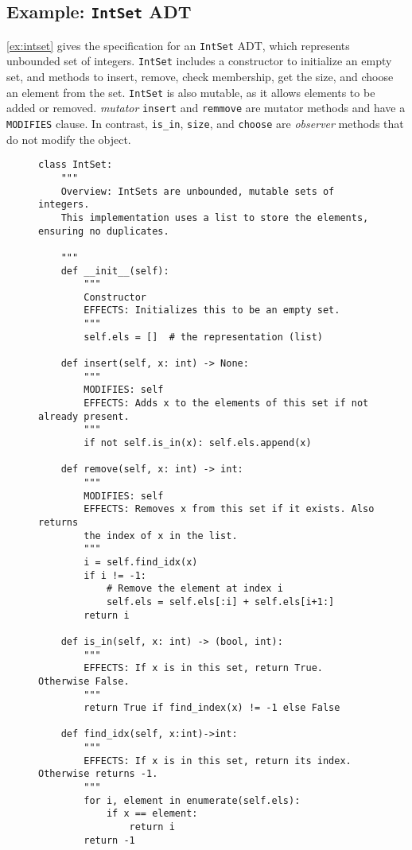 \documentclass[oneside,11pt,dvipsnames]{book}
\newcommand{\code}[1]{\texttt{#1}}
\begin{document}
\subsection{Example: \code{IntSet} ADT}

\autoref{ex:intset} gives the specification for an \code{IntSet} ADT, which represents unbounded set of integers. \code{IntSet} includes a constructor to initialize an empty set, and methods to insert, remove, check membership, get the size, and choose an element from the set. \code{IntSet} is also mutable, as it allows elements to be added or removed. \emph{mutator} \code{insert} and \code{remmove} are mutator methods and have a \code{MODIFIES} clause.  In contrast, \code{is\_in}, \code{size}, and \code{choose} are \emph{observer} methods that do not modify the object.

\begin{figure}
    \begin{lstlisting}
class IntSet:
    """
    Overview: IntSets are unbounded, mutable sets of integers.
    This implementation uses a list to store the elements, ensuring no duplicates.

    """
    def __init__(self):
        """
        Constructor
        EFFECTS: Initializes this to be an empty set.
        """
        self.els = []  # the representation (list)

    def insert(self, x: int) -> None:
        """
        MODIFIES: self
        EFFECTS: Adds x to the elements of this set if not already present.
        """
        if not self.is_in(x): self.els.append(x)
            
    def remove(self, x: int) -> int:
        """
        MODIFIES: self
        EFFECTS: Removes x from this set if it exists. Also returns       
        the index of x in the list.
        """
        i = self.find_idx(x)
        if i != -1:
            # Remove the element at index i
            self.els = self.els[:i] + self.els[i+1:]  
        return i

    def is_in(self, x: int) -> (bool, int):
        """
        EFFECTS: If x is in this set, return True. Otherwise False.
        """
        return True if find_index(x) != -1 else False

    def find_idx(self, x:int)->int:
        """
        EFFECTS: If x is in this set, return its index. Otherwise returns -1.
        """
        for i, element in enumerate(self.els):
            if x == element:
                return i
        return -1


\end{lstlisting}
\end{figure}
\end{document}
